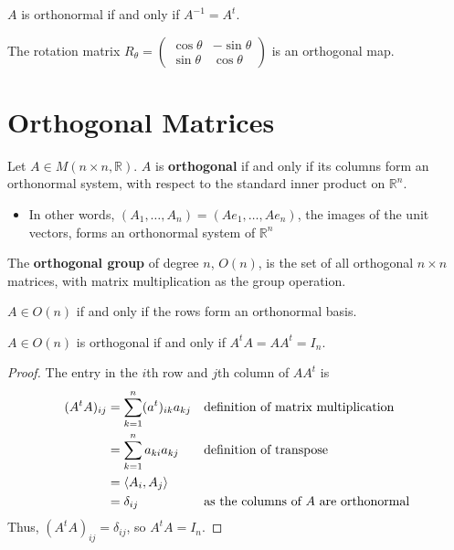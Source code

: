 \documentclass[letterpaper,12pt]{article}
\begin{document}
\begin{corollary}
$A$ is orthonormal if and only if $A^{-1} = A^t$.
\end{corollary}

\begin{example}
The rotation matrix $R_{\theta} = \begin{pmatrix} \cos{\theta} & -\sin{\theta} \\ \sin{\theta} & \cos{\theta} \end{pmatrix}$ is an orthogonal map.
\end{example}

\section*{Orthogonal Matrices}
\begin{definition}
Let $A \in M(n \times n, \mathbb{R})$. $A$ is \textbf{orthogonal} if and only if its columns form an orthonormal system, with respect to the standard inner product on $\mathbb{R}^n$.
\begin{itemize}
    \item In other words, $(A_1, \dots, A_n) = (Ae_1, \dots, Ae_n)$, the images of the unit vectors, forms an orthonormal system of $\mathbb{R}^n$
\end{itemize}
\end{definition}

\begin{definition}
The \textbf{orthogonal group} of degree $n$, $O(n)$, is the set of all orthogonal $n \times n$ matrices, with matrix multiplication as the group operation.
\end{definition}

\begin{corollary}
$A \in O(n)$ if and only if the rows form an orthonormal basis.
\end{corollary}

\begin{corollary}
$A \in O(n)$ is orthogonal if and only if $A^t A = AA^t = I_n$.
\begin{proof}
The entry in the $i$th row and $j$th column of $AA^t$ is
\begin{align*}
    (A^t A)_{ij} & = \sum_{k=1}^n (a^t)_{ik} a_{kj} && \text{definition of matrix multiplication} \\
    & = \sum_{k=1}^n a_{ki} a_{kj} && \text{definition of transpose} \\
    & = \left< A_i, A_j \right> \\
    & = \delta_{ij} && \text{as the columns of $A$ are orthonormal}
\end{align*}
Thus, $(A^t A)_{ij} = \delta_{ij}$, so $A^t A = I_n$.
\end{proof}
\end{corollary}
\end{document}
